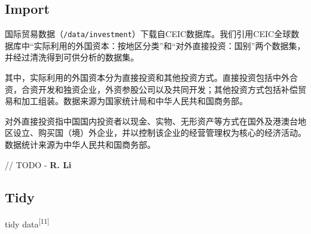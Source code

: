 \documentclass[]{ctexart}
\begin{document}
\hypertarget{import}{%
\subsection{Import}\label{import}}

国际贸易数据（\texttt{/data/investment}）下载自CEIC数据库。我们引用CEIC全球数据库中``实际利用的外国资本：按地区分类''和``对外直接投资：国别''两个数据集，并经过清洗得到可供分析的数据集。

其中，实际利用的外国资本分为直接投资和其他投资方式。直接投资包括中外合资，合资开发和独资企业，外资参股公司以及共同开发；其他投资方式包括补偿贸易和加工组装。数据来源为国家统计局和中华人民共和国商务部。

对外直接投资指中国国内投资者以现金、实物、无形资产等方式在国外及港澳台地区设立、购买国（境）外企业，并以控制该企业的经营管理权为核心的经济活动。数据统计来源为中华人民共和国商务部。

// TODO - \textbf{R. Li}

\hypertarget{tidy}{%
\subsection{Tidy}\label{tidy}}

tidy data\textsuperscript{{[}11{]}}
\end{document}
